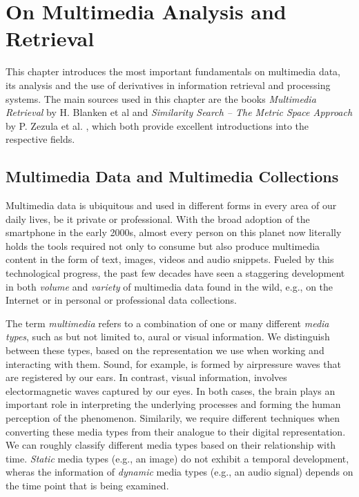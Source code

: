 \chapter{On Multimedia Analysis and Retrieval}
\label{chapter:theory_multimedia_analysis_and_retrieval}

This chapter introduces the most important fundamentals on multimedia data, its analysis and the use of derivatives in information retrieval and processing systems. The main sources used in this chapter are the books \emph{Multimedia Retrieval} by H. Blanken et al \cite{Blanken:2007multimedia} and \emph{Similarity Search -- The Metric Space Approach} by P. Zezula et al. \cite{Zezula:2006similarity}, which both provide excellent introductions into the respective fields.


\section{Multimedia Data and Multimedia Collections}
\label{section:multmedia_data}

Multimedia data is ubiquitous and used in different forms in every area of our daily lives, be it private or professional. With the broad adoption of the smartphone in the early 2000s, almost every person on this planet now literally holds the tools required not only to consume but also produce multimedia content in the form of text, images, videos and audio snippets. Fueled by this technological progress, the past few decades have seen a staggering development in both \emph{volume} and \emph{variety} of multimedia data found in the wild, e.g., on the Internet or in personal or professional data collections. 

The term \emph{multimedia} refers to a combination of one or many different \emph{media types}, such as but not limited to, aural or visual information. We distinguish between these types, based on the representation we use when working and interacting with them. Sound, for example, is formed by airpressure waves that are registered by our ears. In contrast, visual information, involves electormagnetic waves captured by our eyes. In both cases, the brain plays an important role in interpreting the underlying processes and forming the human perception of the phenomenon. Similarily, we require different techniques when converting these media types from their analogue to their digital representation. We can roughly classify different media types based on their relationship with time. \emph{Static} media types (e.g., an image) do not exhibit a temporal development, wheras the information of \emph{dynamic} media types (e.g., an audio signal) depends on the time point that is being examined. \cite{Blanken:2007multimedia}

